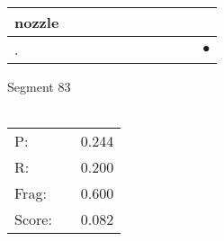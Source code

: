 \documentclass[landscape]{article}
\newcommand{\ssp}{\hspace{2pt}}
\newcommand{\mex}{\cellcolor{g}$\bullet$}
\begin{document}
\begin{tabular}{|l|p{10pt}|p{10pt}|p{10pt}|p{10pt}|p{10pt}|p{10pt}|p{10pt}|p{10pt}|p{10pt}|p{10pt}|}
\hline
\ssp nozzle \ssp&\hspace{2pt}&\hspace{2pt}&\hspace{2pt}&\hspace{2pt}&\hspace{2pt}&\hspace{2pt}&\hspace{2pt}&\hspace{2pt}&\hspace{2pt}&\hspace{2pt}\\
\hline
\ssp \cellcolor{ref9}. \ssp&\hspace{2pt}&\hspace{2pt}&\hspace{2pt}&\hspace{2pt}&\hspace{2pt}&\hspace{2pt}&\hspace{2pt}&\hspace{2pt}&\hspace{2pt}&\hspace{2pt}\mex\\
\hline
\end{tabular}

\vspace{6pt}
\noindent Segment 83\\\\
\noindent\begin{tabular}{lm{12pt}r}
\hline
P:&&0.244\\
R:&&0.200\\
Frag:&&0.600\\
Score:&&0.082\\
\end{tabular}

\newpage
\end{document}
